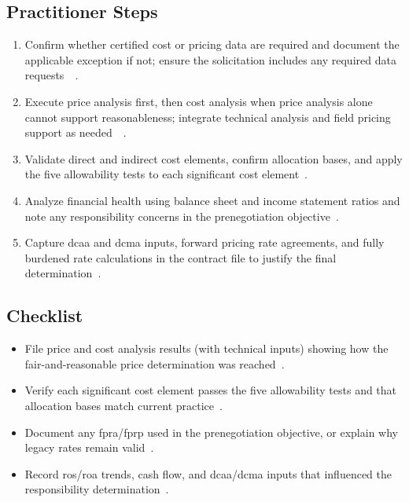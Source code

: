 \documentclass[../main.tex]{subfiles}
\begin{document}
\subsection{Practitioner Steps}
\begin{enumerate}
  \item Confirm whether certified cost or pricing data are required and document the applicable exception if not; ensure the solicitation includes any required data requests~\autocite[\S~15.403-1]{FAR}~\autocite{edo-3-2-4-cost-price-evaluation-2025}.
  \item Execute price analysis first, then cost analysis when price analysis alone cannot support reasonableness; integrate technical analysis and field pricing support as needed~\autocite[\S~15.404-1]{FAR}~\autocite{edo-3-2-4-cost-price-evaluation-2025}.
  \item Validate direct and indirect cost elements, confirm allocation bases, and apply the five allowability tests to each significant cost element~\autocite[\S~31.201-2]{FAR}.
  \item Analyze financial health using balance sheet and income statement ratios and note any responsibility concerns in the prenegotiation objective~\autocite{edo-3-2-4-cost-price-evaluation-2025}.
  \item Capture \ac{dcaa} and \ac{dcma} inputs, forward pricing rate agreements, and fully burdened rate calculations in the contract file to justify the final determination~\autocite{edo-3-2-4-cost-price-evaluation-2025}.
\end{enumerate}

\subsection{Checklist}
\begin{itemize}
  \item File price and cost analysis results (with technical inputs) showing how the fair-and-reasonable price determination was reached~\autocite[\S~15.404-1]{FAR}.
  \item Verify each significant cost element passes the five allowability tests and that allocation bases match current practice~\autocite[\S~31.201-2]{FAR}.
  \item Document any \ac{fpra}/\ac{fprp} used in the prenegotiation objective, or explain why legacy rates remain valid~\autocite[\S~15.407-3]{FAR}.
  \item Record \ac{ros}/\ac{roa} trends, cash flow, and \ac{dcaa}/\ac{dcma} inputs that influenced the responsibility determination~\autocite{edo-3-2-4-cost-price-evaluation-2025}.
\end{itemize}

\end{document}
